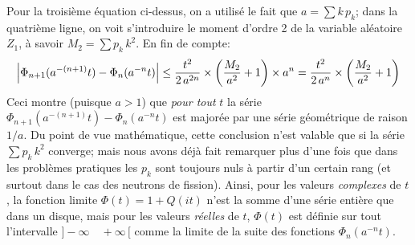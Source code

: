 Pour la troisi\`eme \'equation ci-dessus,  on a utilis\'e le fait que
$a = \sum k\, p_k$;  dans la quatri\`eme ligne,  on voit s'introduire
le moment d'ordre 2 de la variable al\'eatoire $Z_1$,  \`a savoir 
$M_2 = \sum p_k\, k^2$.  En fin de compte:
$$\Bigl|\Phi_{n+1} (a^{-(n+1)}t) - \Phi_n (a^{-n}t)\Bigr| \leq {t^2
\over 2\, a^{2n}}
\times \bigg( {M_2 \over a^2} +1 \bigg) \times a^n = 
{t^2 \over 2\, a^{n}} \times \bigg( {M_2 \over a^2} +1 \bigg)$$
Ceci montre (puisque $a > 1$) que {\it pour tout} $t$ la s\'erie
$\Phi_{n+1} (a^{-(n+1)}t) - \Phi_n (a^{-n}t)$ est major\'ee par une 
s\'erie g\'eom\'etrique de raison $1/a$.  Du point de vue
math\'ematique, cette conclusion n'est  valable que si la s\'erie $\sum
p_k\, k^2$ converge;  mais nous avons d\'ej\`a  fait remarquer plus d'une
fois que dans les probl\`emes pratiques les $p_k$ sont toujours nuls \`a
partir d'un certain rang (et surtout dans le cas des neutrons de fission). 
\medskip
Ainsi,  pour les valeurs {\it complexes} de $t$,  la fonction limite 
$\Phi (t) = 1 + Q(it)$ n'est la somme d'une s\'erie enti\`ere que dans un
disque,  mais pour les valeurs {\it r\'eelles} de $t$,  $\Phi (t)$ est
d\'efinie  sur tout l'intervalle $] -\infty \quad +\infty\, [$ comme 
la limite de la suite des fonctions $\Phi_n (a^{-n}t)$.

\bigskip

